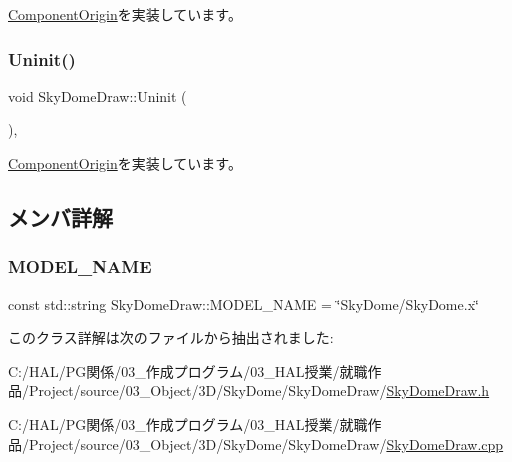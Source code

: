 \mbox{\hyperlink{class_component_origin_a9f674891257f2272b1636d8b6bb05d81}{Component\+Origin}}を実装しています。

\mbox{\label{class_sky_dome_draw_aee1c6b102a97033073b2559b8c2c328b}} 
\subsubsection{\texorpdfstring{Uninit()}{Uninit()}}
{\footnotesize\ttfamily void Sky\+Dome\+Draw\+::\+Uninit (\begin{DoxyParamCaption}{ }\end{DoxyParamCaption})\hspace{0.3cm}{\ttfamily [override]}, {\ttfamily [virtual]}}



\mbox{\hyperlink{class_component_origin_a9f89a93f9c1954bd53f9750e35e6089d}{Component\+Origin}}を実装しています。



\subsection{メンバ詳解}
\mbox{\label{class_sky_dome_draw_a366fd9d1040d77ddac71e335f10f2c29}} 
\subsubsection{\texorpdfstring{M\+O\+D\+E\+L\+\_\+\+N\+A\+ME}{MODEL\_NAME}}
{\footnotesize\ttfamily const std\+::string Sky\+Dome\+Draw\+::\+M\+O\+D\+E\+L\+\_\+\+N\+A\+ME = \char`\"{}Sky\+Dome/Sky\+Dome.\+x\char`\"{}\hspace{0.3cm}{\ttfamily [static]}}



このクラス詳解は次のファイルから抽出されました\+:\begin{DoxyCompactItemize}
\item 
C\+:/\+H\+A\+L/\+P\+G関係/03\+\_\+作成プログラム/03\+\_\+\+H\+A\+L授業/就職作品/\+Project/source/03\+\_\+\+Object/3\+D/\+Sky\+Dome/\+Sky\+Dome\+Draw/\mbox{\hyperlink{_sky_dome_draw_8h}{Sky\+Dome\+Draw.\+h}}\item 
C\+:/\+H\+A\+L/\+P\+G関係/03\+\_\+作成プログラム/03\+\_\+\+H\+A\+L授業/就職作品/\+Project/source/03\+\_\+\+Object/3\+D/\+Sky\+Dome/\+Sky\+Dome\+Draw/\mbox{\hyperlink{_sky_dome_draw_8cpp}{Sky\+Dome\+Draw.\+cpp}}\end{DoxyCompactItemize}
